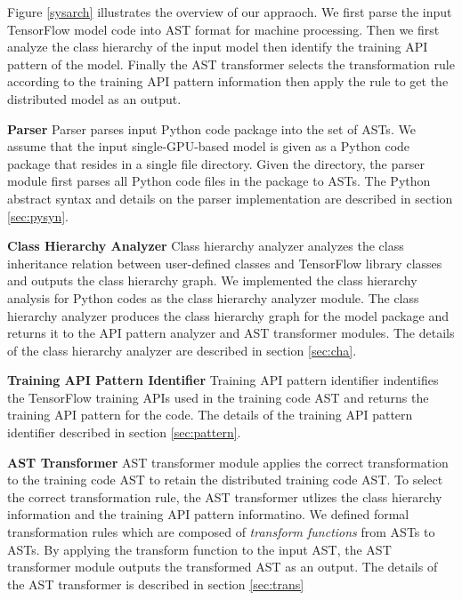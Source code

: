 Figure \ref{sysarch} illustrates the overview of our appraoch.
We first parse the input TensorFlow model code into AST format for machine
processing.
Then we first analyze the class hierarchy of the input model then identify
the training API pattern of the model.
Finally the AST transformer selects the transformation rule according to the
training API pattern information then apply the rule to get the distributed
model as an output.

\textbf{Parser}
Parser parses input Python code package
into the set of ASTs.
We assume that the input single-GPU-based model is given as a Python code
package that resides in a single file directory.
Given the directory, the parser module first parses all Python code files
in the package to ASTs.
The Python abstract syntax and details on the parser implementation
are described in section \ref{sec:pysyn}.

\textbf{Class Hierarchy Analyzer}
Class hierarchy analyzer analyzes the class inheritance relation
between user-defined classes and TensorFlow library classes and
outputs the class hierarchy graph.
We implemented the class hierarchy analysis
for Python codes as the class hierarchy analyzer module.
The class hierarchy analyzer produces the class hierarchy graph
for the model package and returns it to the API pattern analyzer and 
AST transformer modules. The details of the class hierarchy analyzer are
described in section \ref{sec:cha}.

\textbf{Training API Pattern Identifier}
Training API pattern identifier 
indentifies the TensorFlow training APIs used in the training code AST
and returns the training API pattern for the code.
The details of the training API pattern identifier described 
in section \ref{sec:pattern}.

\textbf{AST Transformer}
AST transformer module applies the correct transformation to the
training code AST to retain the distributed training code AST.
To select the correct transformation rule,
the AST transformer utlizes the class hierarchy information and
the training API pattern informatino.
We defined formal transformation rules which are composed of
\textit{transform functions} from ASTs to ASTs.
By applying the transform function to the input AST,
the AST transformer module outputs the transformed AST as an output.
The details of the AST transformer is described in section \ref{sec:trans}
